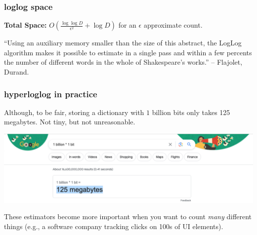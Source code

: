 \documentclass[handout,compress]{beamer}
\begin{document}
\begin{frame}
	\frametitle{loglog space}
	\textbf{Total Space:} $O \left (\frac{\log \log D}{\epsilon^2} + \log D \right )$ for an $\epsilon$ approximate count.
	
	\small ``Using an auxiliary memory smaller than the size of this abstract, the LogLog algorithm makes it possible to estimate in a single pass and within a few percents the number of different words in the whole of Shakespeare’s works.'' -- Flajolet, Durand.
	
	
	\vspace{1em}
\end{frame}

\begin{frame}
	\frametitle{hyperloglog in practice}
	\begin{center} 
		Although, to be fair, storing a dictionary with $1$ billion bits only takes 125 megabytes. Not tiny, but not unreasonable.
		
		\includegraphics[width=\textwidth]{google_bit_calculations.png}
	\end{center}
	These estimators become more important when you want to count \emph{many} different things (e.g., a software company tracking clicks on 100s of UI elements).
\end{frame}
\end{document}
